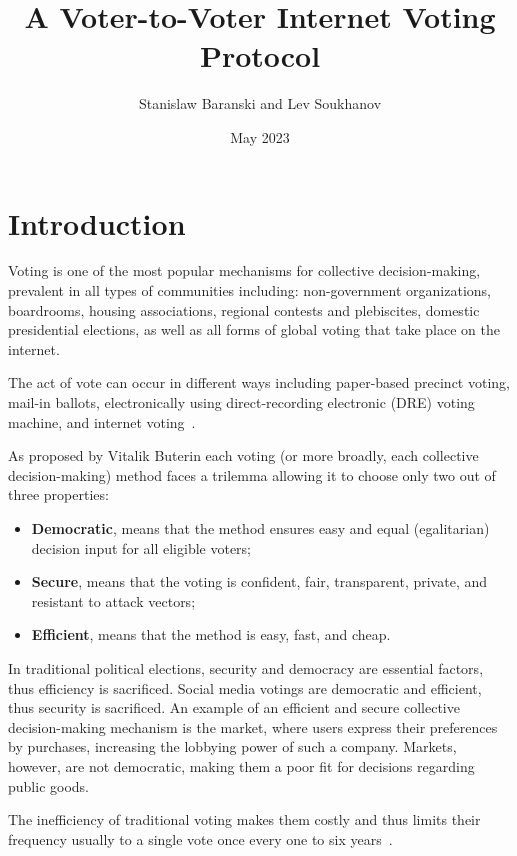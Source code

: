 \documentclass{article}
\title{A Voter-to-Voter Internet Voting Protocol}
\author{Stanislaw Baranski and Lev Soukhanov}
\date{May 2023}
\begin{document}
\maketitle

\section{Introduction}
Voting is one of the most popular mechanisms for collective decision-making, prevalent in all types of communities including: non-government organizations, boardrooms, housing associations, regional contests and plebiscites, domestic presidential elections, as well as all forms of global voting that take place on the internet.

The act of vote can occur in different ways including paper-based precinct voting, mail-in ballots, electronically using direct-recording electronic (DRE) voting machine, and internet voting~\cite{parkGoingBadWorse2021}.

As proposed by Vitalik Buterin\cite{buterinBlockchainVotingOverrated2021} each voting (or more broadly, each collective decision-making) method faces a trilemma allowing it to choose only two out of three properties:

\begin{itemize}
    \item \textbf{Democratic}, means that the method ensures easy and equal (egalitarian) decision input for all eligible voters;
    \item \textbf{Secure}, means that the voting is confident, fair, transparent, private, and resistant to attack vectors;
    \item \textbf{Efficient}, means that the method is easy, fast, and cheap.
\end{itemize}

In traditional political elections, security and democracy are essential factors, thus efficiency is sacrificed. Social media votings are democratic and efficient, thus security is sacrificed. An example of an efficient and secure collective decision-making mechanism is the market, where users express their preferences by purchases, increasing the lobbying power of such a company. Markets, however, are not democratic, making them a poor fit for decisions regarding public goods. 

The inefficiency of traditional voting makes them costly and thus limits their frequency usually to a single vote once every one to six years~\cite{buterinBlockchainVotingOverrated2021}.
\end{document}
